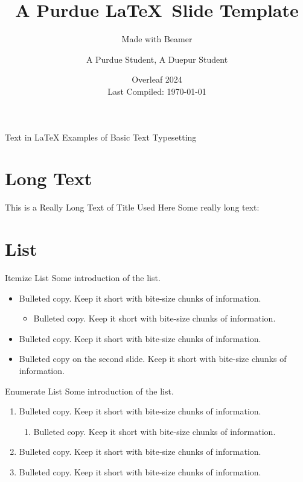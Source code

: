 \documentclass{purdue-slide}
\title{A Purdue \LaTeX\ Slide Template}
\subtitle{Made with Beamer}
\author{A Purdue Student\texorpdfstring{\footnotemark[1]}{}, A Duepur Student\texorpdfstring{\footnotemark[2]}{}}
\institute{\texorpdfstring{\footnotemark[1]}{}Purdue University, \texorpdfstring{\footnotemark[2]}{}Duepur University}
\date{Overleaf 2024 \\ Last Compiled: \today}
\begin{document}
\begin{titleframe}{}
    \maketitle
\end{titleframe}

\begin{titleframe}{Text in \LaTeX}
    Examples of Basic Text Typesetting
\end{titleframe}

\section{Long Text}

\begin{frame}{This is a Really Long Text of Title Used Here}
    Some really long text:
    
    \bigskip
    
    \lipsum[2]
\end{frame}

\section{List}

\begin{frame}{Itemize List}
    Some introduction of the list.
    \begin{itemize}
        \item Bulleted copy. Keep it short with bite-size chunks of information.
        \begin{itemize}
            \item Bulleted copy. Keep it short with bite-size chunks of information.
        \end{itemize}
        \item Bulleted copy. Keep it short with bite-size chunks of information.
        \pause\item Bulleted copy on the second slide. Keep it short with bite-size chunks of information.
    \end{itemize}
\end{frame}

\begin{frame}{Enumerate List}
    Some introduction of the list.
    \begin{enumerate}
        \item Bulleted copy. Keep it short with bite-size chunks of information.
        \begin{enumerate}
            \item Bulleted copy. Keep it short with bite-size chunks of information.
        \end{enumerate}
        \item Bulleted copy. Keep it short with bite-size chunks of information.
        \item Bulleted copy. Keep it short with bite-size chunks of information.
    \end{enumerate}
\end{frame}
\end{document}
